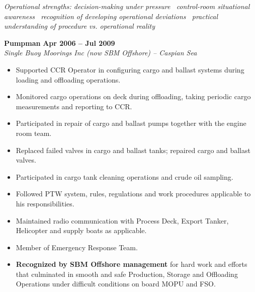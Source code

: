 \documentclass[11pt,a4paper]{article}
\begin{document}
\vspace{4pt}
\textit{Operational strengths: decision-making under pressure \textbullet\ control-room situational awareness \textbullet\ recognition of developing operational deviations \textbullet\ practical understanding of procedure vs. operational reality}

\vspace{8pt}

\textbf{\color{avcsdark}Pumpman} \hfill \textbf{\color{avcsgray}Apr 2006 -- Jul 2009} \\
\textit{Single Buoy Moorings Inc (now SBM Offshore) -- Caspian Sea} \\
\vspace{2pt}
\begin{itemize}[leftmargin=*, nosep, itemsep=2pt]
    \item Supported CCR Operator in configuring cargo and ballast systems during loading and offloading operations.
    \item Monitored cargo operations on deck during offloading, taking periodic cargo measurements and reporting to CCR.
    \item Participated in repair of cargo and ballast pumps together with the engine room team.
    \item Replaced failed valves in cargo and ballast tanks; repaired cargo and ballast valves.
    \item Participated in cargo tank cleaning operations and crude oil sampling.
    \item Followed PTW system, rules, regulations and work procedures applicable to his responsibilities.
    \item Maintained radio communication with Process Deck, Export Tanker, Helicopter and supply boats as applicable.
    \item Member of Emergency Response Team.
    \item \textbf{Recognized by SBM Offshore management} for hard work and efforts that culminated in smooth and safe Production, Storage and Offloading Operations under difficult conditions on board MOPU and FSO.
\end{itemize}

\vspace{8pt}
\end{document}
